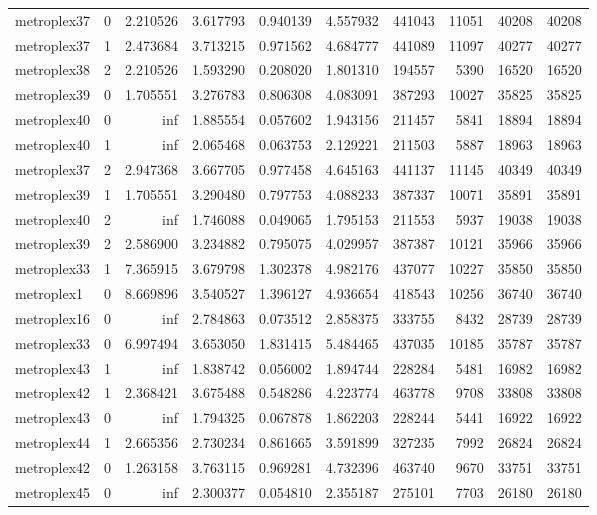 \begin{longtable}{|l|r|r|r|r|r|r|r|r|r|}
metroplex37 & 0 & 2.210526 & 3.617793 & 0.940139 & 4.557932 & 441043 & 11051 & 40208 & 40208 \\
metroplex37 & 1 & 2.473684 & 3.713215 & 0.971562 & 4.684777 & 441089 & 11097 & 40277 & 40277 \\
metroplex38 & 2 & 2.210526 & 1.593290 & 0.208020 & 1.801310 & 194557 & 5390 & 16520 & 16520 \\
metroplex39 & 0 & 1.705551 & 3.276783 & 0.806308 & 4.083091 & 387293 & 10027 & 35825 & 35825 \\
metroplex40 & 0 & inf & 1.885554 & 0.057602 & 1.943156 & 211457 & 5841 & 18894 & 18894 \\
metroplex40 & 1 & inf & 2.065468 & 0.063753 & 2.129221 & 211503 & 5887 & 18963 & 18963 \\
metroplex37 & 2 & 2.947368 & 3.667705 & 0.977458 & 4.645163 & 441137 & 11145 & 40349 & 40349 \\
metroplex39 & 1 & 1.705551 & 3.290480 & 0.797753 & 4.088233 & 387337 & 10071 & 35891 & 35891 \\
metroplex40 & 2 & inf & 1.746088 & 0.049065 & 1.795153 & 211553 & 5937 & 19038 & 19038 \\
metroplex39 & 2 & 2.586900 & 3.234882 & 0.795075 & 4.029957 & 387387 & 10121 & 35966 & 35966 \\
metroplex33 & 1 & 7.365915 & 3.679798 & 1.302378 & 4.982176 & 437077 & 10227 & 35850 & 35850 \\
metroplex1 & 0 & 8.669896 & 3.540527 & 1.396127 & 4.936654 & 418543 & 10256 & 36740 & 36740 \\
metroplex16 & 0 & inf & 2.784863 & 0.073512 & 2.858375 & 333755 & 8432 & 28739 & 28739 \\
metroplex33 & 0 & 6.997494 & 3.653050 & 1.831415 & 5.484465 & 437035 & 10185 & 35787 & 35787 \\
metroplex43 & 1 & inf & 1.838742 & 0.056002 & 1.894744 & 228284 & 5481 & 16982 & 16982 \\
metroplex42 & 1 & 2.368421 & 3.675488 & 0.548286 & 4.223774 & 463778 & 9708 & 33808 & 33808 \\
metroplex43 & 0 & inf & 1.794325 & 0.067878 & 1.862203 & 228244 & 5441 & 16922 & 16922 \\
metroplex44 & 1 & 2.665356 & 2.730234 & 0.861665 & 3.591899 & 327235 & 7992 & 26824 & 26824 \\
metroplex42 & 0 & 1.263158 & 3.763115 & 0.969281 & 4.732396 & 463740 & 9670 & 33751 & 33751 \\
metroplex45 & 0 & inf & 2.300377 & 0.054810 & 2.355187 & 275101 & 7703 & 26180 & 26180 \\

\end{longtable}
